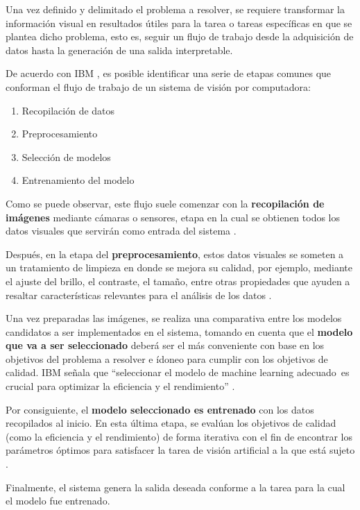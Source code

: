 Una vez definido y delimitado el problema a resolver, se requiere transformar la información visual en resultados útiles para la tarea o tareas específicas en que se plantea dicho problema, esto es, seguir un flujo de trabajo desde la adquisición de datos hasta la generación de una salida interpretable.

De acuerdo con IBM \cite{ibm_computer_vision}, es posible identificar una serie de etapas comunes que conforman el flujo de trabajo de un sistema de visión por computadora:

\begin{enumerate}
    \item Recopilación de datos
    \item Preprocesamiento
    \item Selección de modelos
    \item Entrenamiento del modelo
\end{enumerate}

Como se puede observar, este flujo suele comenzar con la \textbf{recopilación de imágenes} mediante cámaras o sensores, etapa en la cual se obtienen todos los datos visuales que servirán como entrada del sistema \cite{ibm_computer_vision}.

Después, en la etapa del \textbf{preprocesamiento}, estos datos visuales se someten a un tratamiento de limpieza en donde se mejora su calidad, por ejemplo, mediante el ajuste del brillo, el contraste, el tamaño, entre otras propiedades que ayuden a resaltar características relevantes para el análisis de los datos \cite{ibm_computer_vision}.

Una vez preparadas las imágenes, se realiza una comparativa entre los modelos candidatos a ser implementados en el sistema, tomando en cuenta que el \textbf{modelo que va a ser seleccionado} deberá ser el más conveniente con base en los objetivos del problema a resolver e ídoneo para cumplir con los objetivos de calidad. IBM señala que “seleccionar el modelo de machine learning adecuado es crucial para optimizar la eficiencia y el rendimiento” \cite{ibm_computer_vision}.

Por consiguiente, el \textbf{modelo seleccionado es entrenado} con los datos recopilados al inicio. En esta última etapa, se evalúan los objetivos de calidad (como la eficiencia y el rendimiento) de forma iterativa con el fin de encontrar los parámetros óptimos para satisfacer la tarea de visión artificial a la que está sujeto \cite{ibm_computer_vision}.

Finalmente, el sistema genera la salida deseada conforme a la tarea para la cual el modelo fue entrenado.

